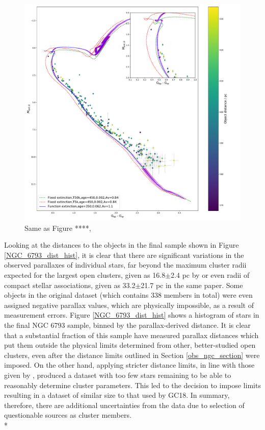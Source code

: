 \documentclass[12pt, a4paper]{report}
\begin{document}
\begin{figure}[h!]
\begin{center}
\includegraphics[width=1.0\textwidth]{../NGC_6793_CMD_FeH_0p062_Av_1p1_350Myr_vizier_model_err_isochrones_summary_errorbars.pdf}
\caption{Same as Figure ****,}
\label{NGC_6793_bossini}
\end{center}
\end{figure}

Looking at the distances to the objects in the final sample shown in Figure \ref{NGC_6793_dist_hist}, it is clear that there are significant variations in the observed parallaxes of individual stars, far beyond the maximum cluster radii expected for the largest open clusters, given as 16.8$\pm$2.4 pc by \cite{2006A&A...456..523S} or even radii of compact stellar associations, given as 33.2$\pm$21.7 pc in the same paper. Some objects in the original dataset (which contains 338 members in total) were even assigned negative parallax values, which are physically impossible, as a result of measurement errors. Figure \ref{NGC_6793_dist_hist} shows a histogram of stars in the final NGC 6793 sample, binned by the parallax-derived distance. It is clear that a substantial fraction of this sample have measured parallax distances which put them outside the physical limits determined from other, better-studied open clusters, even after the distance limits outlined in Section \ref{obs_ngc_section} were imposed. On the other hand, applying stricter distance limits, in line with those given by \cite{2006A&A...456..523S}, produced a dataset with too few stars remaining to be able to reasonably determine cluster parameters. This led to the decision to impose limits resulting in a dataset of similar size to that used by GC18. In summary, therefore, there are additional uncertainties from the data due to selection of questionable sources as cluster members. \\*
\end{document}
